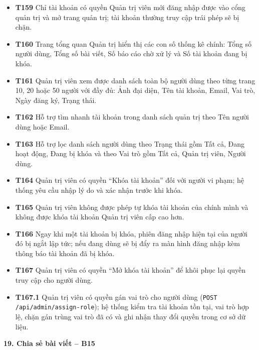 \documentclass[11pt,a4paper]{article}
\begin{document}
\begin{itemize}[leftmargin=0.9cm, label=$\bullet$, itemsep=2pt, topsep=4pt]
    \item \textbf{T159} Chỉ tài khoản có quyền Quản trị viên mới đăng nhập được vào cổng quản trị và mở trang quản trị; tài khoản thường truy cập trái phép sẽ bị chặn.
    \item \textbf{T160} Trang tổng quan Quản trị hiển thị các con số thống kê chính: Tổng số người dùng, Tổng số bài viết, Số báo cáo chờ xử lý và Số tài khoản đang bị khóa.
    \item \textbf{T161} Quản trị viên xem được danh sách toàn bộ người dùng theo từng trang 10, 20 hoặc 50 người với đầy đủ: Ảnh đại diện, Tên tài khoản, Email, Vai trò, Ngày đăng ký, Trạng thái.
    \item \textbf{T162} Hỗ trợ tìm nhanh tài khoản trong danh sách quản trị theo Tên người dùng hoặc Email.
    \item \textbf{T163} Hỗ trợ lọc danh sách người dùng theo Trạng thái gồm Tất cả, Đang hoạt động, Đang bị khóa và theo Vai trò gồm Tất cả, Quản trị viên, Người dùng.
    \item \textbf{T164} Quản trị viên có quyền ``Khóa tài khoản'' đối với người vi phạm; hệ thống yêu cầu nhập lý do và xác nhận trước khi khóa.
    \item \textbf{T165} Quản trị viên không được phép tự khóa tài khoản của chính mình và không được khóa tài khoản Quản trị viên cấp cao hơn.
    \item \textbf{T166} Ngay khi một tài khoản bị khóa, phiên đăng nhập hiện tại của người đó bị ngắt lập tức; nếu đang dùng sẽ bị đẩy ra màn hình đăng nhập kèm thông báo tài khoản đã bị khóa.
    \item \textbf{T167} Quản trị viên có quyền ``Mở khóa tài khoản'' để khôi phục lại quyền truy cập cho người dùng.
    \item \textbf{T167.1} Quản trị viên có quyền gán vai trò cho người dùng (\texttt{POST /api/admin/assign-role}); hệ thống kiểm tra tài khoản tồn tại, vai trò hợp lệ, chặn gán trùng vai trò đã có và ghi nhận thay đổi quyền trong cơ sở dữ liệu.
\end{itemize}
\smallskip
\noindent\textbf{19. Chia sẻ bài viết -- B15}
\end{document}
